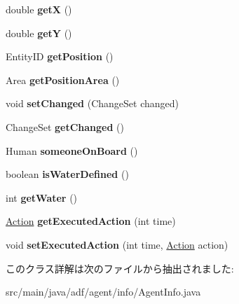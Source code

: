 \begin{DoxyCompactItemize}
double {\bfseries getX} ()
\item 
\hypertarget{classadf_1_1agent_1_1info_1_1AgentInfo_a3c368a98edf3219b66b03fcce86b7eeb}{}\label{classadf_1_1agent_1_1info_1_1AgentInfo_a3c368a98edf3219b66b03fcce86b7eeb} 
double {\bfseries getY} ()
\item 
\hypertarget{classadf_1_1agent_1_1info_1_1AgentInfo_a749267c8b12d5e206345f7b754925c16}{}\label{classadf_1_1agent_1_1info_1_1AgentInfo_a749267c8b12d5e206345f7b754925c16} 
Entity\+ID {\bfseries get\+Position} ()
\item 
\hypertarget{classadf_1_1agent_1_1info_1_1AgentInfo_a8e1f8015e29c723f977cfa64eee9db6b}{}\label{classadf_1_1agent_1_1info_1_1AgentInfo_a8e1f8015e29c723f977cfa64eee9db6b} 
Area {\bfseries get\+Position\+Area} ()
\item 
\hypertarget{classadf_1_1agent_1_1info_1_1AgentInfo_a2df7c9be9a65d6796952b74860fe655e}{}\label{classadf_1_1agent_1_1info_1_1AgentInfo_a2df7c9be9a65d6796952b74860fe655e} 
void {\bfseries set\+Changed} (Change\+Set changed)
\item 
\hypertarget{classadf_1_1agent_1_1info_1_1AgentInfo_a8ced695c70693675d0d1b65fc2bb5798}{}\label{classadf_1_1agent_1_1info_1_1AgentInfo_a8ced695c70693675d0d1b65fc2bb5798} 
Change\+Set {\bfseries get\+Changed} ()
\item 
\hypertarget{classadf_1_1agent_1_1info_1_1AgentInfo_abe66f0a428ce365f3c38504e7ec89046}{}\label{classadf_1_1agent_1_1info_1_1AgentInfo_abe66f0a428ce365f3c38504e7ec89046} 
Human {\bfseries someone\+On\+Board} ()
\item 
\hypertarget{classadf_1_1agent_1_1info_1_1AgentInfo_a3413ebc871d37b53ba0de67581605058}{}\label{classadf_1_1agent_1_1info_1_1AgentInfo_a3413ebc871d37b53ba0de67581605058} 
boolean {\bfseries is\+Water\+Defined} ()
\item 
\hypertarget{classadf_1_1agent_1_1info_1_1AgentInfo_adb5d3d2ccf79c87a8f266425da451a71}{}\label{classadf_1_1agent_1_1info_1_1AgentInfo_adb5d3d2ccf79c87a8f266425da451a71} 
int {\bfseries get\+Water} ()
\item 
\hypertarget{classadf_1_1agent_1_1info_1_1AgentInfo_ab0623e4d050cd2581c694083aeac18a0}{}\label{classadf_1_1agent_1_1info_1_1AgentInfo_ab0623e4d050cd2581c694083aeac18a0} 
\hyperlink{classadf_1_1agent_1_1action_1_1Action}{Action} {\bfseries get\+Executed\+Action} (int time)
\item 
\hypertarget{classadf_1_1agent_1_1info_1_1AgentInfo_ae384e6762b685e108a11fa70cc652ff5}{}\label{classadf_1_1agent_1_1info_1_1AgentInfo_ae384e6762b685e108a11fa70cc652ff5} 
void {\bfseries set\+Executed\+Action} (int time, \hyperlink{classadf_1_1agent_1_1action_1_1Action}{Action} action)
\end{DoxyCompactItemize}


このクラス詳解は次のファイルから抽出されました\+:\begin{DoxyCompactItemize}
\item 
src/main/java/adf/agent/info/Agent\+Info.\+java\end{DoxyCompactItemize}
